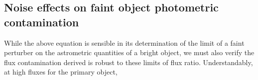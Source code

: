 \documentclass[fleqn,usenatbib]{mnras}
\begin{document}
\subsection{Noise effects on faint object photometric contamination}
While the above equation is sensible in its determination of the limit of a faint perturber on the astrometric quantities of a bright object, we must also verify the flux contamination derived is robust to these limits of flux ratio. Understandably, at high fluxes for the primary object, 








\bsp	%
\label{lastpage}
\end{document}
